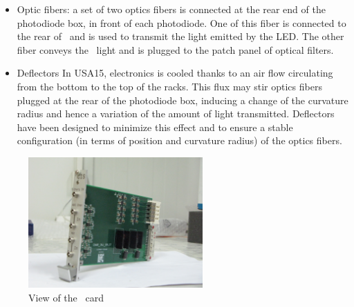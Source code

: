 \begin{itemize}
\item Optic fibers: a set of two optics fibers is connected at the rear end of the photodiode box, in front of each photodiode. One of this fiber is connected to the rear of \phocal~and is used to transmit the light emitted by the LED. The other fiber conveys the \laser~light and is plugged to the patch panel of optical filters. 
\item Deflectors
In USA15, electronics is cooled thanks to an air flow circulating from the bottom to the top of the racks. This flux may stir optics fibers plugged at the rear of the photodiode box, inducing a change of the curvature radius and hence a variation of the amount of light transmitted. Deflectors have been designed to minimize this effect and to ensure a stable configuration (in terms of position and curvature radius) of the optics fibers.
\end{itemize}

\begin{figure}[htbp]
\centering
\includegraphics[height=5cm]{figures/cis.JPG}
\caption{View of the  \charinjsplit~card}\label{fig:lascis}
\end{figure}
